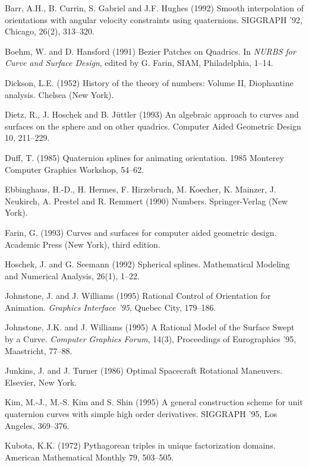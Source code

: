 %

\begin{thebibliography}{99}

Barr, A.H., B. Currin, S. Gabriel and J.F. Hughes (1992)
Smooth interpolation of orientations with angular velocity
constraints using quaternions.  SIGGRAPH '92, Chicago, 26(2), 313--320.

Boehm, W. and D. Hansford (1991)
Bezier Patches on Quadrics.
In {\em NURBS for Curve and Surface Design}, edited by G. Farin,
SIAM, Philadelphia, 1--14.

Dickson, L.E. (1952) History of the theory of numbers: Volume II,
Diophantine analysis.  Chelsea (New York).

Dietz, R., J. Hoschek and B. J\"{u}ttler (1993)
An algebraic approach to curves and surfaces on the sphere and on other
quadrics.  Computer Aided Geometric Design 10, 211--229.

Duff, T. (1985)
Quaternion splines for animating orientation.
1985 Monterey Computer Graphics Workshop, 54--62.

Ebbinghaus, H.-D., H. Hermes, F. Hirzebruch, M. Koecher, K. Mainzer,
J. Neukirch, A. Prestel and R. Remmert (1990)
Numbers.
Springer-Verlag (New York).

Farin, G. (1993) Curves and surfaces for computer aided geometric design.
Academic Press (New York), third edition.

Hoschek, J. and G. Seemann (1992)
Spherical splines.
Mathematical Modeling and Numerical Analysis, 26(1), 1--22.

Johnstone, J. and J. Williams (1995)
Rational Control of Orientation for Animation.
{\em Graphics Interface '95}, Quebec City, 179--186.

Johnstone, J.K. and J. Williams (1995)
A Rational Model of the Surface Swept by a Curve.
{\em Computer Graphics Forum}, 14(3), Proceedings of Eurographics '95,
Maastricht, 77--88.

Junkins, J. and J. Turner (1986)
Optimal Spacecraft Rotational Maneuvers.
Elsevier, New York.

Kim, M.-J., M.-S. Kim and S. Shin (1995)
A general construction scheme for unit quaternion curves with simple
high order derivatives.
SIGGRAPH '95, Los Angeles, 369--376. 

Kubota, K.K. (1972) Pythagorean triples in unique factorization domains.
American Mathematical Monthly 79, 503--505.


\end{thebibliography}
